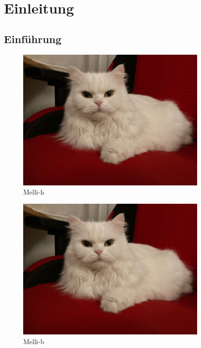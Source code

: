 \documentclass[12pt,ngerman,parskip=full]{scrreprt}
\begin{document}
\chapter{Einleitung}
\section{Einführung}
\blindtext[2]

\begin{figure}[h]\centering
\includegraphics[width=0.85\textwidth]{Images/Katze}
\caption{Melli-h}
\end{figure}

\blindtext[2]

\blindtext[2]

\begin{figure}[b]\centering
\includegraphics[width=0.85\textwidth]{Images/Katze}
\caption{Melli-b}
\end{figure}
\end{document}
